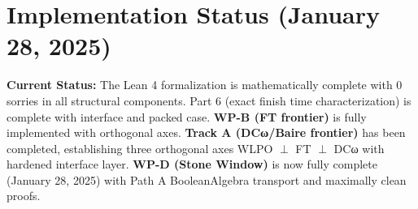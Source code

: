 \documentclass[11pt]{article}
\theoremstyle{definition}
\theoremstyle{remark}
\begin{document}
\section{Implementation Status (January 28, 2025)}

\begin{mdframed}[style=status]
\textbf{Current Status:} The Lean 4 formalization is mathematically complete with 0 sorries in all structural components. Part 6 (exact finish time characterization) is complete with interface and packed case. \textbf{WP-B (FT frontier)} is fully implemented with orthogonal axes. \textbf{Track A (DCω/Baire frontier)} has been completed, establishing three orthogonal axes WLPO $\perp$ FT $\perp$ DCω with hardened interface layer. \textbf{WP-D (Stone Window)} is now fully complete (January 28, 2025) with Path A BooleanAlgebra transport and maximally clean proofs.
\end{mdframed}
\end{document}
